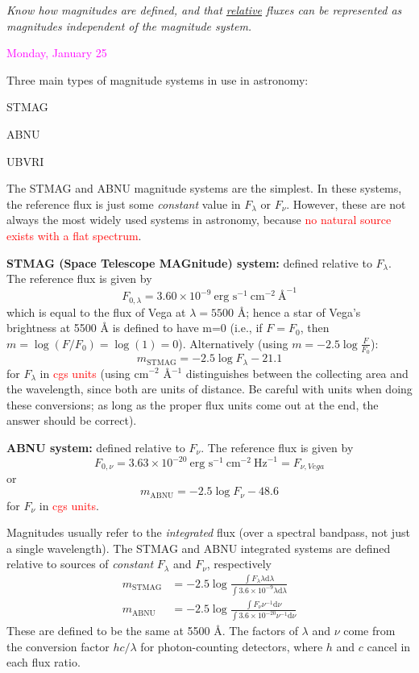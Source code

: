 \documentclass[12pt]{article}
\begin{document}
\textcolor{om}{\emph{Know how magnitudes are defined, and that
\underline{relative} fluxes can be represented as magnitudes independent of the
magnitude system.}}

\textcolor{magenta}{Monday, January 25}

Three main types of magnitude systems in use in astronomy:
\begin{enumerate*}
    \item STMAG
    \item ABNU
    \item UBVRI
\end{enumerate*}
The STMAG and ABNU magnitude systems are the simplest.
In these systems, the reference flux is just some \emph{constant} value in
$F_{\lambda}$ or $F_{\nu}$. However, these are not always the most widely used
systems in astronomy, because
\textcolor{red}{no natural source exists with a flat spectrum}.

\textbf{STMAG (Space Telescope MAGnitude) system:}
defined relative to $F_{\lambda}$. The reference flux is given by
$$    F_{0,\lambda} = 3.60 \times 10^{-9}\ \textrm{erg\ s}^{-1}\
    \textrm{cm}^{-2}\ \textrm{\AA{}}^{-1} $$
which is equal to the flux of Vega at $\lambda = 5500$ \AA{};
hence a star of Vega's brightness at 5500 \AA{} is defined to have m=0
(i.e., if $F = F_{0}$, then $m=\log(F/F_{0}) = \log(1) = 0$).
Alternatively (using $m = -2.5\log \frac{F}{F_0}$):
$$    m_{\textrm{STMAG}} = -2.5 \log F_{\lambda} - 21.1 $$
for $F_{\lambda}$ in \textcolor{red}{cgs units} (using cm$^{-2}$ \AA{}$^{-1}$
distinguishes between the collecting area and the wavelength, since both are
units of distance. Be careful with units when doing these conversions; as
long as the proper flux units come out at the end, the answer should be
correct).

\textbf{ABNU system:}
defined relative to $F_{\nu}$. The reference flux is given by
$$ F_{0,\nu} = 3.63 \times 10^{-20}\ \textrm{erg\ s}^{-1}\
    \textrm{cm}^{-2}\ \textrm{Hz}^{-1} = F_{\nu,Vega} $$
or
$$     m_{\textrm{ABNU}} = -2.5 \log F_{\nu} - 48.6 $$
for $F_{\nu}$ in \textcolor{red}{cgs units}.

Magnitudes usually refer to the \emph{integrated} flux (over a
spectral bandpass, not just a single wavelength).
The STMAG and ABNU integrated systems are defined relative to sources
of \emph{constant} $F_{\lambda}$ and $F_{\nu}$, respectively
\begin{align*}
    m_{\textrm{STMAG}} &= -2.5 \log \frac{\int F_{\lambda} \lambda
    \textrm{d}\lambda}{\int3.6\times10^{-9}\lambda\textrm{d}\lambda}\\
    m_{\textrm{ABNU}} &= -2.5 \log \frac{\int F_{\nu}\nu^{-1}
\textrm{d}\nu}{\int 3.6 \times 10^{-20}\nu^{-1}\textrm{d}\nu}
\end{align*}
These are defined to be the same at 5500 \AA{}.
The factors of $\lambda$ and $\nu$ come from the conversion factor
$hc/\lambda$ for photon-counting detectors, where $h$ and $c$ cancel
in each flux ratio.
\end{document}
